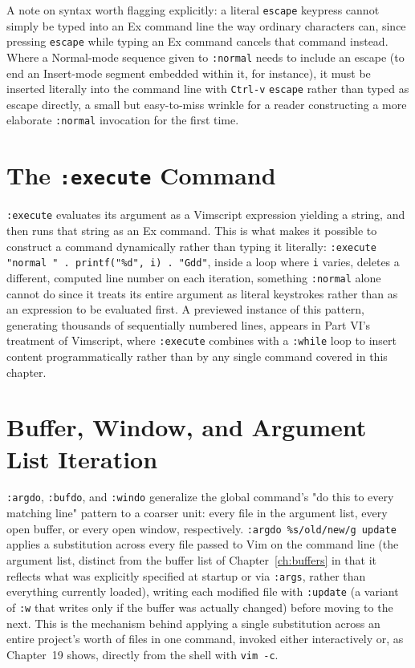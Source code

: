 A note on syntax worth flagging explicitly: a literal \texttt{escape} keypress cannot simply be typed into an Ex command line the way ordinary characters can, since pressing \texttt{escape} while typing an Ex command cancels that command instead. Where a Normal-mode sequence given to \texttt{:normal} needs to include an escape (to end an Insert-mode segment embedded within it, for instance), it must be inserted literally into the command line with \texttt{Ctrl-v} \texttt{escape} rather than typed as escape directly, a small but easy-to-miss wrinkle for a reader constructing a more elaborate \texttt{:normal} invocation for the first time.

\section{The \texttt{:execute} Command}

\texttt{:execute} evaluates its argument as a Vimscript expression yielding a string, and then runs that string as an Ex command. This is what makes it possible to construct a command dynamically rather than typing it literally: \texttt{:execute "normal " . printf("\%d", i) . "Gdd"}, inside a loop where \texttt{i} varies, deletes a different, computed line number on each iteration, something \texttt{:normal} alone cannot do since it treats its entire argument as literal keystrokes rather than as an expression to be evaluated first. A previewed instance of this pattern, generating thousands of sequentially numbered lines, appears in Part VI's treatment of Vimscript, where \texttt{:execute} combines with a \texttt{:while} loop to insert content programmatically rather than by any single command covered in this chapter.

\section{Buffer, Window, and Argument List Iteration}

\texttt{:argdo}, \texttt{:bufdo}, and \texttt{:windo} generalize the global command's "do this to every matching line" pattern to a coarser unit: every file in the argument list, every open buffer, or every open window, respectively. \texttt{:argdo \%s/old/new/g \textbar update} applies a substitution across every file passed to Vim on the command line (the argument list, distinct from the buffer list of Chapter~\ref{ch:buffers} in that it reflects what was explicitly specified at startup or via \texttt{:args}, rather than everything currently loaded), writing each modified file with \texttt{:update} (a variant of \texttt{:w} that writes only if the buffer was actually changed) before moving to the next. This is the mechanism behind applying a single substitution across an entire project's worth of files in one command, invoked either interactively or, as Chapter~19 shows, directly from the shell with \texttt{vim -c}.

